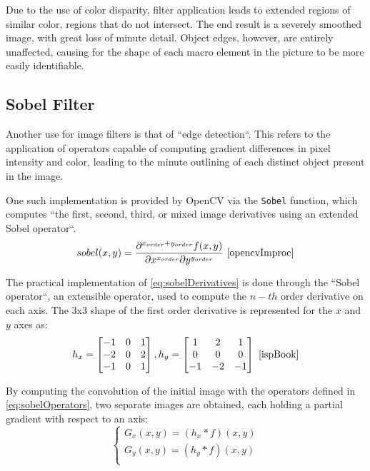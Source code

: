 Due to the use of color disparity, filter application leads to extended regions of similar color, regions that
do not intersect. The end result is a severely smoothed image, with great loss of minute detail. Object edges,
however, are entirely unaffected, causing for the shape of each macro element in the picture to be more easily
identifiable.

\subsection{Sobel Filter}

Another use for image filters is that of ``edge detection``. This refers to the application of operators
capable  of computing gradient differences in pixel intensity and color, leading to the minute outlining of
each distinct object present in the image.

One such implementation is provided by OpenCV via the \verb|Sobel| function, which computes ``the first,
second, third, or mixed image derivatives using an extended Sobel operator``.
\begin{equation}
	\label{eq:sobelDerivatives}
	sobel(x, y) =
	{{\partial^{x_{order}+y_{order}}f(x, y)}\over{\partial x^{x_{order}} \partial y^{y_{order}}}}
	\text{ \cite{opencvImproc}}
\end{equation}

The practical implementation of \cref{eq:sobelDerivatives} is done through the ``Sobel operator``, an
extensible operator, used to compute the \(n-th\) order derivative on each axis. The 3x3 shape of the
first order derivative is represented for the \(x\) and \(y\) axes as:
\begin{equation}
	\label{eq:sobelOperators}
	h_x =
	\begin{bmatrix}
		-1 & 0 & 1 \\
		-2 & 0 & 2 \\
		-1 & 0 & 1 \\
	\end{bmatrix}
	,
	h_y =
	\begin{bmatrix}
		1  & 2  & 1  \\
		0  & 0  & 0  \\
		-1 & -2 & -1 \\
	\end{bmatrix}
	\text{ \cite{ispBook}}
\end{equation}

By computing the convolution of the initial image with the operators defined in \cref{eq:sobelOperators},
two separate images are obtained, each holding a partial gradient with respect to an axis:
\begin{equation}
	\label{eq:sobelResults}
	\begin{cases}
		G_x(x, y) = (h_x * f)(x, y) \\
		G_y(x, y) = (h_y * f)(x, y) \\
	\end{cases}
\end{equation}


